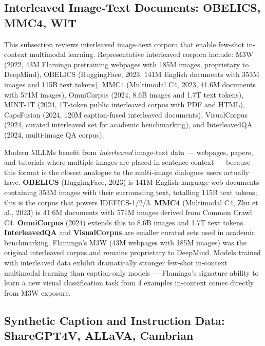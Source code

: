 \documentclass{article}
\begin{document}
\subsection{Interleaved Image-Text Documents: OBELICS, MMC4, WIT}\label{interleaved-image-text-documents-obelics-mmc4-wit}

This subsection reviews interleaved image--text corpora that enable few-shot in-context multimodal learning. Representative interleaved corpora include: M3W (2022, 43M Flamingo pretraining webpages with 185M images, proprietary to DeepMind), OBELICS (HuggingFace, 2023, 141M English documents with 353M images and 115B text tokens), MMC4 (Multimodal C4, 2023, 41.6M documents with 571M images), OmniCorpus (2024, 8.6B images and 1.7T text tokens), MINT-1T (2024, 1T-token public interleaved corpus with PDF and HTML), CapsFusion (2024, 120M caption-fused interleaved documents), VisualCorpus (2024, curated interleaved set for academic benchmarking), and InterleavedQA (2024, multi-image QA corpus).

Modern MLLMs benefit from \emph{interleaved} image-text data --- webpages, papers, and tutorials where multiple images are placed in sentence context --- because this format is the closest analogue to the multi-image dialogues users actually have. \textbf{OBELICS} (HuggingFace, 2023) is 141M English-language web documents containing 353M images with their surrounding text, totalling 115B text tokens; this is the corpus that powers IDEFICS-1/2/3. \textbf{MMC4} (Multimodal C4, Zhu et al., 2023) is 41.6M documents with 571M images derived from Common Crawl C4. \textbf{OmniCorpus} (2024) extends this to 8.6B images and 1.7T text tokens. \textbf{InterleavedQA} and \textbf{VisualCorpus} are smaller curated sets used in academic benchmarking. Flamingo's M3W (43M webpages with 185M images) was the original interleaved corpus and remains proprietary to DeepMind. Models trained with interleaved data exhibit dramatically stronger few-shot in-context multimodal learning than caption-only models --- Flamingo's signature ability to learn a new visual classification task from 4 examples in-context comes directly from M3W exposure.

\subsection{Synthetic Caption and Instruction Data: ShareGPT4V, ALLaVA, Cambrian}\label{synthetic-caption-and-instruction-data-sharegpt4v-allava-cambrian}
\end{document}
